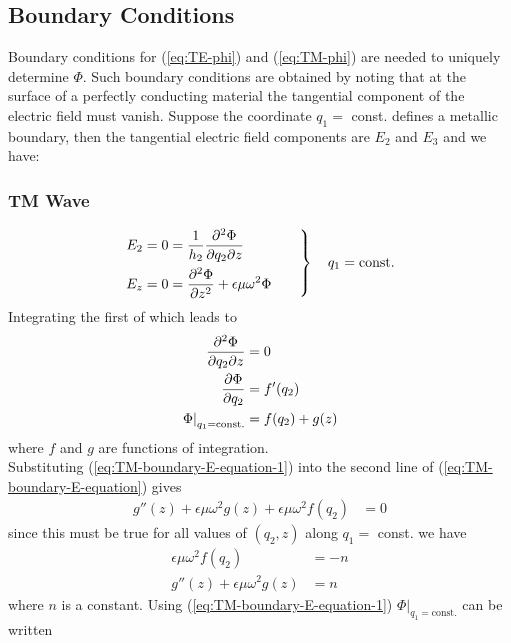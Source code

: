 \documentclass[twoside, a4paper]{article}
\begin{document}
\subsection{Boundary Conditions}

Boundary conditions for (\ref{eq:TE-phi}) and (\ref{eq:TM-phi}) are needed to uniquely determine $\Phi$. Such boundary conditions are obtained by noting that at the surface of a perfectly conducting material the tangential component of the electric field must vanish. Suppose the coordinate $q_1=$ const. defines a metallic boundary, then the tangential electric field components are $E_2$ and $E_3$ and we have: \\

\subsubsection{TM Wave}
\begin{equation}
\label{eq:TM-boundary-E-equation}
\left.
\begin{split}
E_2 = 0  & = \frac{1}{h_2} \frac{\partial^2 \Phi}{\partial q_2 \partial z} \\
E_z = 0  & = \frac{\partial^2 \Phi}{\partial z^2} + \epsilon \mu \omega^2 \Phi  
\end{split}
\quad \quad
\right\}
\quad
q_1 = \mathrm{const.}
\end{equation}
Integrating the first of which leads to
\begin{align}
\label{eq:TM-boundary-E-equation-1}
\frac{\partial^2 \Phi}{\partial q_2 \partial z} & = 0 \nonumber \\
\frac{\partial \Phi}{\partial q_2} & = f'(q_2) \nonumber \\
\left. \Phi \right|_{q_1 = \mathrm{const.}} & = f(q_2) + g(z)
\end{align}
where $f$ and $g$ are functions of integration. \\
Substituting (\ref{eq:TM-boundary-E-equation-1}) into the second line of (\ref{eq:TM-boundary-E-equation}) gives
\begin{align*}
\label{eq:TM-boundary-E-equation-2}
g''(z) + \epsilon \mu \omega^2 g(z) + \epsilon \mu \omega^2 f(q_2)
& = 0 
\end{align*}
since this must be true for all values of $(q_2,z)$ along $q_1 =$ const. we have
\begin{align*}
\epsilon \mu \omega^2 f(q_2) & = -n \\
g''(z) + \epsilon \mu \omega^2 g(z) & = n
\end{align*}
where $n$ is a constant. Using (\ref{eq:TM-boundary-E-equation-1}) $\left. \Phi \right|_{q_1 = \mathrm{const.}}$ can be written
\end{document}
